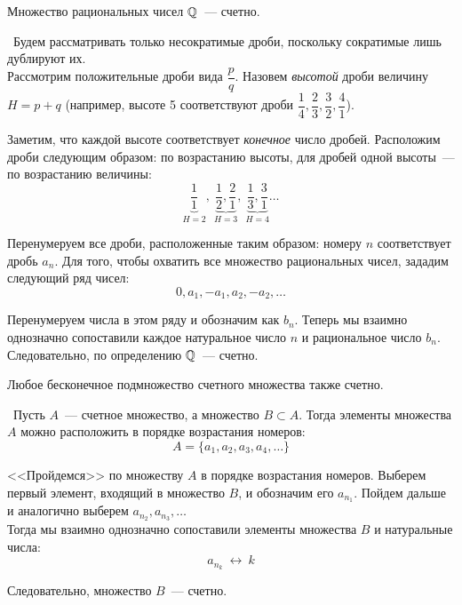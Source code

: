 
\begin{theorem}
Множество рациональных чисел \(\mathbb{Q}\)~--- счетно.

\vspace{2mm}

\proofname~Будем рассматривать только несократимые дроби,
поскольку сократимые лишь дублируют их. \\

Рассмотрим положительные дроби вида \(\dfrac{p}{q}\). Назовем \textit{высотой}
дроби величину \(H = p+q\) (например, высоте 5 соответствуют дроби
\(\dfrac{1}{4}, \dfrac{2}{3}, \dfrac{3}{2}, \dfrac{4}{1}\)).

Заметим, что каждой высоте соответствует \textit{конечное} число дробей.
Расположим дроби следующим образом: по возрастанию высоты,
для дробей одной высоты~--- по возрастанию величины:
\[
\underbrace{\frac{1}{1}}_{H=2},~ \underbrace{\frac{1}{2}, \frac{2}{1}}_{H=3},
~\underbrace{\frac{1}{3},\frac{3}{1}}_{H=4}\dots
\]

Перенумеруем все дроби, расположенные таким образом:
номеру \(n\) соответствует дробь \(a_{n}\).
Для того, чтобы охватить все множество рациональных чисел, зададим
следующий ряд чисел:
\[
0, a_{1}, -a_{1}, a_{2}, -a_{2}, \dots
\]

Перенумеруем числа в этом ряду и обозначим как \(b_{n}\).
Теперь мы взаимно однозначно сопоставили
каждое натуральное число \(n\) и рациональное число \(b_{n}\).
Следовательно, по определению \(\mathbb{Q}\)~--- счетно.~\qedsymbol
\end{theorem}

\begin{lemma}
Любое бесконечное подмножество счетного множества также счетно.

\vspace{2mm}

\proofname~Пусть \(A\)~--- счетное множество, а множество \(B\subset A\).
Тогда элементы множества \(A\) можно расположить в порядке возрастания номеров:
\[
A = \{a_{1}, a_{2}, a_{3}, a_{4}, \dots\}
\]

<<Пройдемся>> по множеству \(A\) в порядке возрастания номеров.
Выберем первый элемент, входящий в множество \(B\), и обозначим его \(a_{n_{1}}\).
Пойдем дальше и аналогично выберем \(a_{n_{2}},a_{n_{3}},\dots\)\\
Тогда мы взаимно однозначно сопоставили элементы множества \(B\) и натуральные числа:
\[
a_{n_{k}} ~ \longleftrightarrow ~ k
\]

Следовательно, множество \(B\)~--- счетно.
\end{lemma}

